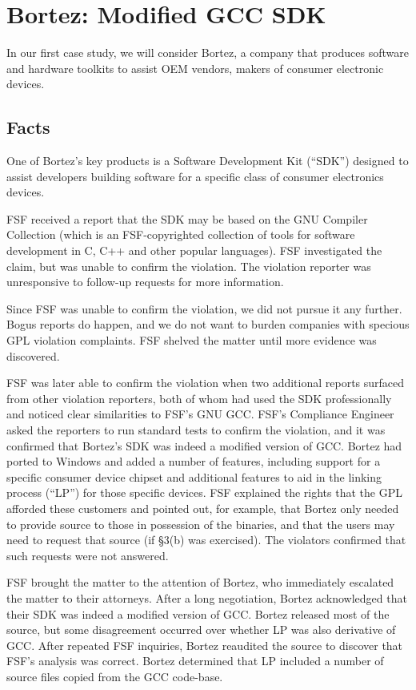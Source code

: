 \chapter{Bortez: Modified GCC SDK}

In our first case study, we will consider Bortez, a company that
produces software and hardware toolkits to assist OEM vendors, makers
of consumer electronic devices.

\section{Facts}

One of Bortez's key products is a Software Development Kit (``SDK'')
designed to assist developers building software for a specific class of
consumer electronics devices.

FSF received a report that the SDK may be based on the GNU Compiler
Collection (which is an FSF-copyrighted collection of tools for software
development in C, C++ and other popular languages). FSF investigated the
claim, but was unable to confirm the violation. The violation reporter
was unresponsive to follow-up requests for more information.

Since FSF was unable to confirm the violation, we did not pursue it any
further. Bogus reports do happen, and we do not want to burden companies
with specious GPL violation complaints. FSF shelved the matter until
more evidence was discovered.

FSF was later able to confirm the violation when two additional reports
surfaced from other violation reporters, both of whom had used the SDK
professionally and noticed clear similarities to FSF's GNU GCC\@. FSF's
Compliance Engineer asked the reporters to run standard tests to confirm
the violation, and it was confirmed that Bortez's SDK was indeed a
modified version of GCC\@. Bortez had ported to Windows and added a number
of features, including support for a specific consumer device chipset and
additional features to aid in the linking process (``LP'') for those
specific devices. FSF explained the rights that the GPL afforded these
customers and pointed out, for example, that Bortez only needed to provide
source to those in possession of the binaries, and that the users may need
to request that source (if \S 3(b) was exercised). The violators
confirmed that such requests were not answered.

FSF brought the matter to the attention of Bortez, who immediately
escalated the matter to their attorneys. After a long negotiation,
Bortez acknowledged that their SDK was indeed a modified version of
GCC\@. Bortez released most of the source, but some disagreement
occurred over whether LP was also derivative of GCC\@. After repeated
FSF inquiries, Bortez reaudited the source to discover that FSF's
analysis was correct. Bortez determined that LP included a number of
source files copied from the GCC code-base.

